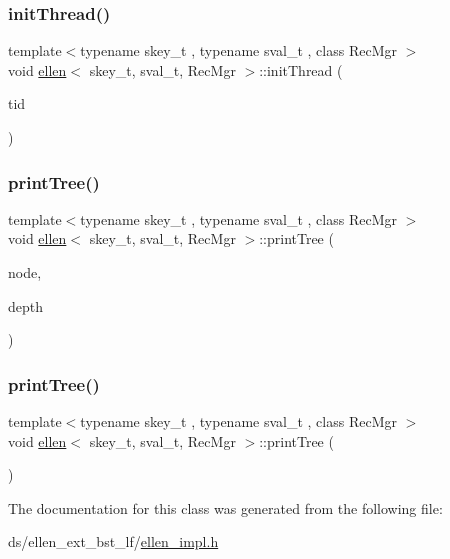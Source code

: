 \mbox{\label{classellen_a5a9378e1af473ce6080251945409d95e}} 
\subsubsection{\texorpdfstring{init\+Thread()}{initThread()}}
{\footnotesize\ttfamily template$<$typename skey\+\_\+t , typename sval\+\_\+t , class Rec\+Mgr $>$ \\
void \hyperlink{classellen}{ellen}$<$ skey\+\_\+t, sval\+\_\+t, Rec\+Mgr $>$\+::init\+Thread (\begin{DoxyParamCaption}\item[{const int}]{tid }\end{DoxyParamCaption})\hspace{0.3cm}{\ttfamily [inline]}}

\mbox{\label{classellen_aa3a69ee3923a54a50d423f670054ac25}} 
\subsubsection{\texorpdfstring{print\+Tree()}{printTree()}\hspace{0.1cm}{\footnotesize\ttfamily [1/2]}}
{\footnotesize\ttfamily template$<$typename skey\+\_\+t , typename sval\+\_\+t , class Rec\+Mgr $>$ \\
void \hyperlink{classellen}{ellen}$<$ skey\+\_\+t, sval\+\_\+t, Rec\+Mgr $>$\+::print\+Tree (\begin{DoxyParamCaption}\item[{\hyperlink{structnode__t}{node\+\_\+t}$<$ skey\+\_\+t, sval\+\_\+t $>$ $\ast$}]{node,  }\item[{int}]{depth }\end{DoxyParamCaption})\hspace{0.3cm}{\ttfamily [inline]}}

\mbox{\label{classellen_ae941b46c05563895737175b543633202}} 
\subsubsection{\texorpdfstring{print\+Tree()}{printTree()}\hspace{0.1cm}{\footnotesize\ttfamily [2/2]}}
{\footnotesize\ttfamily template$<$typename skey\+\_\+t , typename sval\+\_\+t , class Rec\+Mgr $>$ \\
void \hyperlink{classellen}{ellen}$<$ skey\+\_\+t, sval\+\_\+t, Rec\+Mgr $>$\+::print\+Tree (\begin{DoxyParamCaption}{ }\end{DoxyParamCaption})\hspace{0.3cm}{\ttfamily [inline]}}



The documentation for this class was generated from the following file\+:\begin{DoxyCompactItemize}
\item 
ds/ellen\+\_\+ext\+\_\+bst\+\_\+lf/\hyperlink{ellen__impl_8h}{ellen\+\_\+impl.\+h}\end{DoxyCompactItemize}
